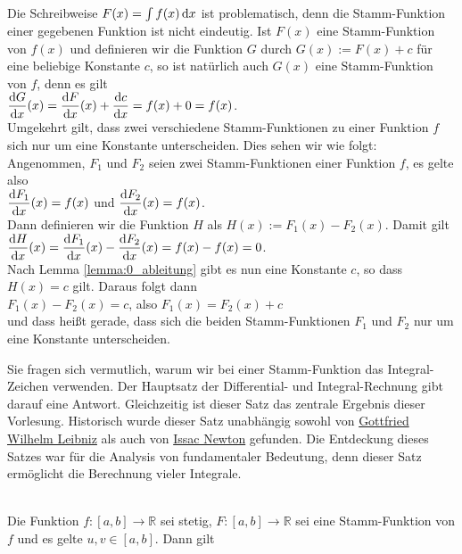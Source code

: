 Die Schreibweise $F(x) = \int f(x) \, \textrm{d} x$ ist problematisch, denn die Stamm-Funktion einer
gegebenen Funktion ist nicht eindeutig.  Ist $F(x)$ eine Stamm-Funktion von $f(x)$ und
definieren wir die Funktion $G$ durch $G(x) := F(x) + c$ f\"ur eine beliebige Konstante $c$,
so ist nat\"urlich auch $G(x)$ eine Stamm-Funktion von $f$, denn es gilt
\\[0.2cm]
\hspace*{1.3cm}
$\displaystyle\frac{\textrm{d}G}{\textrm{d}x}(x) = \displaystyle\frac{\textrm{d}F}{\textrm{d}x}(x) + \displaystyle\frac{\textrm{d}c}{\textrm{d}x} = f(x) + 0 = f(x)$.
\\[0.2cm]
Umgekehrt gilt, dass zwei verschiedene Stamm-Funktionen zu einer Funktion $f$ sich nur um
eine Konstante unterscheiden.  Dies sehen wir wie folgt: Angenommen, $F_1$ und $F_2$ seien
zwei Stamm-Funktionen einer Funktion $f$, es gelte also 
\\[0.2cm]
\hspace*{1.3cm}
$\displaystyle\frac{\textrm{d}F_1}{\textrm{d}x}(x) = f(x)$ \quad und \quad $\displaystyle\frac{\textrm{d}F_2}{\textrm{d}x}(x) = f(x)$.
\\[0.2cm]
Dann definieren wir die Funktion $H$ als $H(x) := F_1(x) - F_2(x)$.  Damit gilt
\\[0.2cm]
\hspace*{1.3cm}
$\displaystyle\frac{\textrm{d}H}{\textrm{d}x}(x) = \displaystyle\frac{\textrm{d}F_1}{\textrm{d}x}(x) - \displaystyle\frac{\textrm{d}F_2}{\textrm{d}x}(x) = f(x) - f(x) = 0$.
\\[0.2cm]
Nach Lemma \ref{lemma:0_ableitung} gibt es nun eine Konstante $c$, so dass $H(x) = c$ gilt.
Daraus folgt dann
\\[0.2cm]
\hspace*{1.3cm}
$F_1(x) - F_2(x) = c$, \quad also \quad $F_1(x) = F_2(x) + c$
\\[0.2cm]
und dass hei{\ss}t gerade, dass sich die beiden Stamm-Funktionen $F_1$ und $F_2$ nur um eine Konstante
unterscheiden.   

Sie fragen sich vermutlich, warum wir bei einer Stamm-Funktion das Integral-Zeichen verwenden.
Der Hauptsatz der Differential- und Integral-Rechnung gibt darauf eine Antwort.  Gleichzeitig ist
dieser Satz das zentrale Ergebnis dieser Vorlesung.  Historisch wurde dieser Satz unabh\"angig sowohl
von \href{https://en.wikipedia.org/wiki/Gottfried_Wilhelm_Leibniz}{Gottfried Wilhelm Leibniz} als
auch von \href{https://en.wikipedia.org/wiki/Isaac_Newton}{Issac Newton} gefunden.  Die Entdeckung
dieses Satzes war f\"ur die Analysis von  fundamentaler Bedeutung, denn dieser Satz erm\"oglicht die
Berechnung vieler Integrale.

\begin{Satz} \hspace*{\fill} \\
 Die Funktion $f:[a,b] \rightarrow\mathbb{R}$ sei stetig, $F:[a,b] \rightarrow\mathbb{R}$
sei eine Stamm-Funktion von $f$ und es gelte $u,v\in[a,b]$.  Dann gilt
\\[0.2cm]
\hspace*{1.3cm}
\colorbox{red}{\colorbox{orange}{}}  
\end{Satz}


